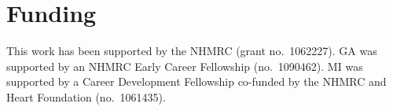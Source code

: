 \documentclass{bioinfo}
\begin{document}
\section*{Funding}

This work has been supported by the NHMRC (grant no.~1062227). GA was supported
by an NHMRC Early Career Fellowship (no.~1090462). MI was supported by a
Career Development Fellowship co-funded by the NHMRC and Heart Foundation
(no.~1061435).\vspace*{-12pt}




%
%
%
%
%
%
%
\end{document}
